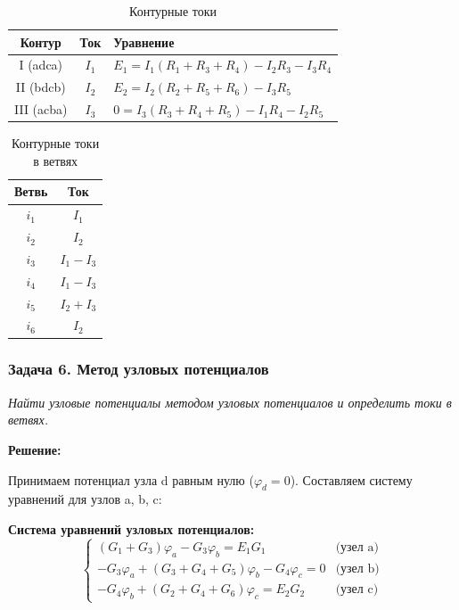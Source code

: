 \begin{table}[H]
\centering
\begin{tabular}{|c|c|l|}
\hline
\textbf{Контур} & \textbf{Ток} & \textbf{Уравнение} \\
\hline
I (adca) & $I_1$ & $E_1 = I_1(R_1+R_3+R_4) - I_2R_3 - I_3R_4$ \\
\hline
II (bdcb) & $I_2$ & $E_2 = I_2(R_2+R_5+R_6) - I_3R_5$ \\
\hline
III (acba) & $I_3$ & $0 = I_3(R_3+R_4+R_5) - I_1R_4 - I_2R_5$ \\
\hline
\end{tabular}
\caption{Контурные токи}
\label{tab:loop_current_equations}
\end{table}

\begin{table}[H]
\centering
\begin{tabular}{|c|c|}
\hline
\textbf{Ветвь} & \textbf{Ток} \\
\hline
$i_1$ & $I_1$ \\
\hline
$i_2$ & $I_2$ \\
\hline
$i_3$ & $I_1 - I_3$ \\
\hline
$i_4$ & $I_1 - I_3$ \\
\hline
$i_5$ & $I_2 + I_3$ \\
\hline
$i_6$ & $I_2$ \\
\hline
\end{tabular}
\caption{Контурные токи в ветвях}
\label{tab:loop_to_branch_currents}
\end{table}

\subsubsection{Задача 6. Метод узловых потенциалов}
\textit{Найти узловые потенциалы методом узловых потенциалов и определить токи в ветвях.}

\textbf{Решение:}

Принимаем потенциал узла d равным нулю ($\varphi_d = 0$). Составляем систему уравнений для узлов a, b, c:

\textbf{Система уравнений узловых потенциалов:}
$$\begin{cases}
(G_1 + G_3)\varphi_a - G_3\varphi_b = E_1 G_1 & \text{(узел a)} \\
-G_3\varphi_a + (G_3 + G_4 + G_5)\varphi_b - G_4\varphi_c = 0 & \text{(узел b)} \\
-G_4\varphi_b + (G_2 + G_4 + G_6)\varphi_c = E_2 G_2 & \text{(узел c)}
\end{cases}$$

